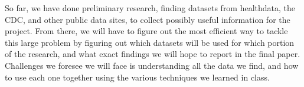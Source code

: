 \documentclass[12pt]{article}
\begin{document}
So far, we have done preliminary research, finding datasets from healthdata, the CDC, and other public data sites, to collect possibly useful information for the project. From there, we will have to figure out the most efficient way to tackle this large problem by figuring out which datasets will be used for which portion of the research, and what exact findings we will hope to report in the final paper. Challenges we foresee we will face is understanding all the data we find, and how to use each one together using the various techniques we learned in class.
\end{document}
